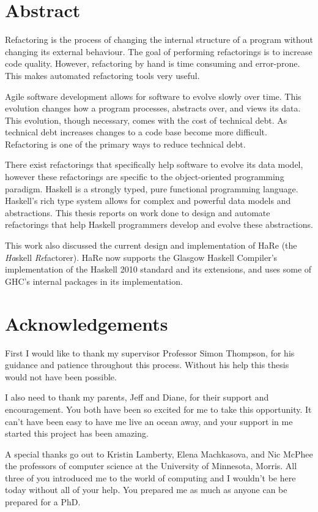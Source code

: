 \begin{preface}
\section{Abstract}

Refactoring is the process of changing the internal structure of a program without changing its external behaviour. The goal of performing refactorings is to increase code quality. However, refactoring by hand is time consuming and error-prone. This makes automated refactoring tools very useful.

Agile software development allows for software to evolve slowly over time. This evolution changes how a program processes, abstracts over, and views its data. This evolution, though necessary, comes with the cost of technical debt. As technical debt increases changes to a code base become more difficult. Refactoring is one of the primary ways to  reduce technical debt. 

There exist refactorings that specifically help software to evolve its data model, however these refactorings are specific to the object-oriented programming paradigm. Haskell is a strongly typed, pure functional programming language. Haskell's rich type system allows for complex and powerful data models and abstractions. This thesis reports on work done to design and automate refactorings that help Haskell programmers develop and evolve these abstractions.

This work also discussed the current design and implementation of HaRe (the \textit{Ha}skell \textit{Re}factorer). HaRe now supports the Glasgow Haskell Compiler's implementation of the Haskell 2010 standard and its extensions, and uses some of GHC's internal packages in its implementation. 

\section{Acknowledgements}
First I would like to thank my supervisor Professor Simon Thompson, for his guidance and patience throughout this process. Without his help this thesis would not have been possible.

I also need to thank my parents, Jeff and Diane, for their support and encouragement. You both have been so excited for me to take this opportunity. It can't have been easy to have me live an ocean away, and your support in me started this project has been amazing.

A special thanks go out to Kristin Lamberty, Elena Machkasova, and Nic McPhee the professors of computer science at the University of Minnesota, Morris. All three of you introduced me to the world of computing and I wouldn't be here today without all of your help. You prepared me as much as anyone can be prepared for a PhD.


\end{preface}
